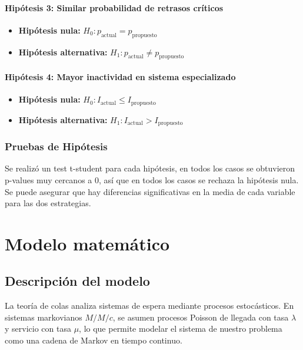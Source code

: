 \documentclass[letterpaper, 12pt]{report}
\begin{document}
\subsubsection{Hipótesis 3: Similar probabilidad de retrasos críticos}
\begin{itemize}
    \item \textbf{Hipótesis nula:} $H_0: p_{\text{actual}} = p_{\text{propuesto}}$ 
    \item \textbf{Hipótesis alternativa:} $H_1: p_{\text{actual}} \neq p_{\text{propuesto}}$ 
\end{itemize}


\subsubsection{Hipótesis 4: Mayor inactividad en sistema especializado}
\begin{itemize}
    \item \textbf{Hipótesis nula:} $H_0: I_{\text{actual}} \leq I_{\text{propuesto}}$ 
    \item \textbf{Hipótesis alternativa:} $H_1: I_{\text{actual}} > I_{\text{propuesto}}$ 
\end{itemize}

\subsection{Pruebas de Hipótesis}

Se realiz\'o un test t-student para cada hipótesis, en todos los casos se 
obtuvieron p-values muy cercanos a 0, así que en todos los casos
se rechaza la hipótesis nula. Se puede asegurar que hay diferencias significativas
en la media de cada variable para las dos estrategias.

\chapter{Modelo matemático}


\section{Descripción del modelo}

La teoría de colas analiza sistemas de espera mediante procesos estocásticos. En sistemas markovianos $M/M/c$, se asumen procesos Poisson de llegada con tasa $\lambda$ y servicio con tasa $\mu$, lo que permite modelar el sistema de nuestro problema como una cadena de Markov en tiempo continuo. \\
\end{document}
